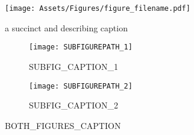 \begin{figure}[h]
	\centering
	\texttt{[image: Assets/Figures/figure\_filename.pdf]}
	\caption{a succinct and describing caption}
	\label{fig:reference_label}
\end{figure}

\begin{figure}[ht!]
	\centering
		\begin{subfigure}[t]{.5\textwidth}
			\centering\captionsetup{width=.9\linewidth}%
			\texttt{[image: SUBFIGUREPATH\_1]}
			\caption{SUBFIG_CAPTION_1}
			\label{SUBFIG_LABEL_1}
		\end{subfigure}%
		\begin{subfigure}[t]{.5\textwidth}
			\centering\captionsetup{width=.9\linewidth}%
			\texttt{[image: SUBFIGUREPATH\_2]}
			\caption{SUBFIG_CAPTION_2}
			\label{SUBFIG_LABEL_2}
		\end{subfigure}
	\caption{BOTH_FIGURES_CAPTION}
	\label{BOTH_FIGURES_LABEL}
\end{figure}